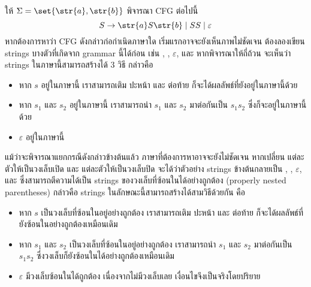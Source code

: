 \begin{example}
ให้ $\Sigma=\set{\str{a},\str{b}}$ \enskip พิจารณา CFG ต่อไปนี้
\[S \to \str{a}S\str{b} \mid SS \mid \varepsilon\]
หากต้องการหาว่า CFG ดังกล่าวก่อกำเนิดภาษาใด เริ่มแรกอาจจะยังเห็นภาพไม่ชัดเจน ต้องลองเขียน strings บางตัวที่เกิดจาก grammar นี้ได้ก่อน เช่น , , $\varepsilon$, และ  หากพิจารณาให้ถี่ถ้วน จะเห็นว่า strings ในภาษานี้สามารถสร้างได้ 3 วิธี กล่าวคือ
\begin{itemize}
\item หาก $s$ อยู่ในภาษานี้ เราสามารถเติม  ปะหน้า และ  ต่อท้าย ก็จะได้ผลลัพธ์ที่ยังอยู่ในภาษานี้ด้วย
\item หาก $s_1$ และ $s_2$ อยู่ในภาษานี้ เราสามารถนำ $s_1$ และ $s_2$ มาต่อกันเป็น $s_1s_2$ ซึ่งก็จะอยู่ในภาษานี้ด้วย
\item $\varepsilon$ อยู่ในภาษานี้
\end{itemize}
แม้ว่าจะพิจารณาแยกกรณีดังกล่าวข้างต้นแล้ว ภาษาที่ต้องการหาอาจจะยังไม่ชัดเจน \enskip หากเปลี่ยน  แต่ละตัวให้เป็นวงเล็บเปิด \str{(} และ  แต่ละตัวให้เป็นวงเล็บปิด \str{)} จะได้ว่าตัวอย่าง strings ข้างต้นกลายเป็น \str{((()))}, \str{()()}, $\varepsilon$, และ \str{(()())} ซึ่งสามารถตีความได้เป็น strings ของวงเล็บที่ซ้อนในได้อย่างถูกต้อง (properly nested parentheses) กล่าวคือ strings ในลักษณะนี้สามารถสร้างได้สามวิธีด้วยกัน คือ
\begin{itemize}
\item หาก $s$ เป็นวงเล็บที่ซ้อนในอยู่อย่างถูกต้อง เราสามารถเติม \str{(} ปะหน้า และ \str{)} ต่อท้าย ก็จะได้ผลลัพธ์ที่ยังซ้อนในอย่างถูกต้องเหมือนเดิม
\item หาก $s_1$ และ $s_2$ เป็นวงเล็บที่ซ้อนในอยู่อย่างถูกต้อง เราสามารถนำ $s_1$ และ $s_2$ มาต่อกันเป็น $s_1s_2$ ซึ่งวงเล็บก็ยังซ้อนในได้อย่างถูกต้องเหมือนเดิม
\item $\varepsilon$ มีวงเล็บซ้อนในได้ถูกต้อง เนื่องจากไม่มีวงเล็บเลย เงื่อนไขจึงเป็นจริงโดยปริยาย
\end{itemize}
\end{example}

